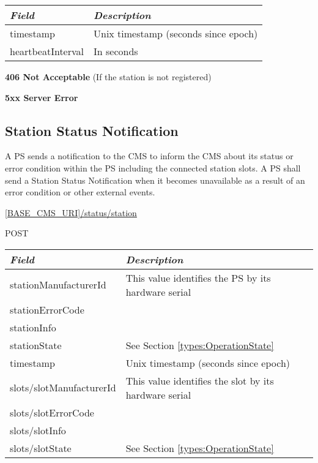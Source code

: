 \begin{tabularx}{\linewidth}{ | l | X | }
  \hline
  \textit{Field} & \textit{Description} \\
  \hline \hline
  timestamp & Unix timestamp (seconds since epoch) \\
  heartbeatInterval & In seconds \\
    \hline
\end{tabularx}

\textbf{406 Not Acceptable} (If the station is not registered)

\textbf{5xx Server Error}

\subsection{Station Status Notification}

A \acs{PS} sends a notification to the \acs{CMS} to inform the \acs{CMS} about its status or error condition within the \acs{PS} including the connected station slots. A \acs{PS} shall send a Station Status Notification when it becomes unavailable as a result of an error condition or other external events.

 \url{[BASE_CMS_URI]/status/station}

 POST

\newpage
{}
\begin{table}[!h]
\vspace{-7mm}
\begin{tabularx}{\linewidth}{ | l | X | }
  \hline
  \textit{Field} & \textit{Description} \\
  \hline \hline
  stationManufacturerId 		& This value identifies the \acs{PS} by its hardware serial\\
  stationErrorCode & \\
  stationInfo & \\
  stationState & See Section \ref{types:OperationState} \\
  timestamp & Unix timestamp (seconds since epoch) \\
  slots/slotManufacturerId 	& This value identifies the slot by its hardware serial \\
  slots/slotErrorCode & \\
  slots/slotInfo & \\
  slots/slotState & See Section \ref{types:OperationState} \\
  \hline
\end{tabularx}
\end{table}

